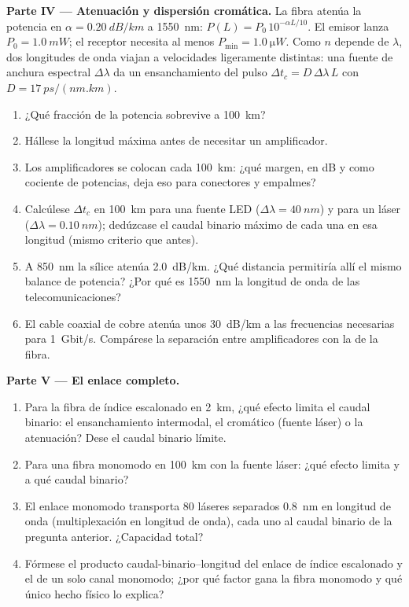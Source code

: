 \begin{problem}
\medskip
\noindent\textbf{Parte IV --- Atenuación y dispersión cromática.}
La fibra atenúa la potencia en $\alpha = \qty{0.20}{dB/km}$ a
\qty{1550}{nm}: $P(L) = P_0\,10^{-\alpha L/10}$. El emisor lanza
$P_0 = \qty{1.0}{mW}$; el receptor necesita al menos
$P_{\min} = \qty{1.0}{\micro W}$. Como $n$ depende de $\lambda$, dos
longitudes de onda viajan a velocidades ligeramente distintas: una fuente
de anchura espectral $\Delta\lambda$ da un ensanchamiento del pulso
$\Delta t_c = D\,\Delta\lambda\,L$ con $D = \qty{17}{ps/(nm.km)}$.
\begin{enumerate}[resume]
  \item ¿Qué fracción de la potencia sobrevive a \qty{100}{km}?
  \item Hállese la longitud máxima antes de necesitar un amplificador.
  \item Los amplificadores se colocan cada \qty{100}{km}: ¿qué margen, en
        dB y como cociente de potencias, deja eso para conectores y
        empalmes?
  \item Calcúlese $\Delta t_c$ en \qty{100}{km} para una fuente LED
        ($\Delta\lambda = \qty{40}{nm}$) y para un láser
        ($\Delta\lambda = \qty{0.10}{nm}$); dedúzcase el caudal binario
        máximo de cada una en esa longitud (mismo criterio que antes).
  \item A \qty{850}{nm} la sílice atenúa \qty{2.0}{dB/km}. ¿Qué distancia
        permitiría allí el mismo balance de potencia? ¿Por qué es
        \qty{1550}{nm} la longitud de onda de las telecomunicaciones?
  \item El cable coaxial de cobre atenúa unos \qty{30}{dB/km} a las
        frecuencias necesarias para \qty{1}{Gbit/s}. Compárese la
        separación entre amplificadores con la de la fibra.
\end{enumerate}

\medskip
\noindent\textbf{Parte V --- El enlace completo.}
\begin{enumerate}[resume]
  \item Para la fibra de índice escalonado en \qty{2}{km}, ¿qué efecto
        limita el caudal binario: el ensanchamiento intermodal, el
        cromático (fuente láser) o la atenuación? Dese el caudal binario
        límite.
  \item Para una fibra monomodo en \qty{100}{km} con la fuente láser:
        ¿qué efecto limita y a qué caudal binario?
  \item El enlace monomodo transporta $80$ láseres separados
        \qty{0.8}{nm} en longitud de onda (multiplexación en longitud de
        onda), cada uno al caudal binario de la pregunta anterior.
        ¿Capacidad total?
  \item Fórmese el producto caudal-binario--longitud del enlace de índice
        escalonado y el de un solo canal monomodo; ¿por qué factor gana la
        fibra monomodo y qué único hecho físico lo explica?
\end{enumerate}
\end{problem}

